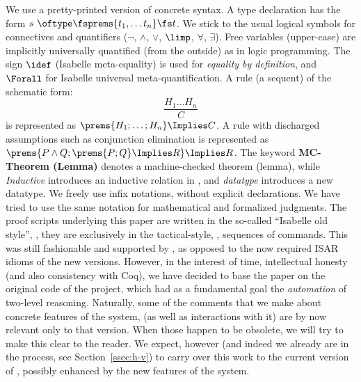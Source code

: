 \documentclass[final]{svjour3}
\begin{document}
 \begin{notation}[\HOL]  
   We use a pretty-printed version of \HOL concrete syntax. A type
   declaration has the form \mbox{$s\ \oftype \fsprems{t_1,\dots t_n}
     \fs t$}.  We stick to the usual logical symbols for \HOL
   connectives and quantifiers ($\neg$, $\land$, $\lor$, $\limp$,
   $\forall$, $\exists$).  Free variables (upper-case) are implicitly
   universally quantified (from the outside) as in logic programming.
   The sign $\idef$ (Isabelle meta-equality) is used for
   \emph{equality by definition}, and $\Forall$ for Isabelle universal
   meta-quantification.  A rule (a sequent) of the schematic form: $$
   \frac {H_1\dots H_n}{C}$$ is represented as $\prems{H_1;\dots; H_n}
   \Implies C$. A rule with discharged assumptions such as conjunction
   elimination is represented as $\prems{ P \land Q ; \prems{P;Q}
     \Implies R} \Implies R$.  The keyword \textbf{MC-Theorem (Lemma)}
   denotes a machine-checked theorem (lemma), while \emph{Inductive}
   introduces an inductive relation in \HOL, and
   \emph{datatype} introduces a new datatype.
   We freely use infix notations, without explicit declarations.  We
   have tried to use the same notation for mathematical and formalized
   judgments. The proof scripts underlying this paper are written in
   the so-called ``Isabelle old style'', \ie, they are exclusively in
   the tactical-style, \eg, sequences of
   commands. This was still fashionable and supported by , as
   opposed to the now required ISAR \cite{ISAR} idioms of the new \HOL
   versions.  However, in the interest of time, intellectual honesty
   (and also consistency with Coq), we have decided to base the paper
   on the original code of the project, which had as a fundamental
   goal the \emph{automation} of two-level reasoning.  Naturally, some
   of the comments that we make about concrete features of the system,
   (as well as interactions with it) are by now relevant only to that
   version. When those happen to be obsolete, we will try to make this
   clear to the reader. We expect, however (and indeed we already are
   in the process, see Section~\ref{ssec:h-v}) to carry over this work
   to the current version of \HOL, possibly enhanced by the new
   features of the system.
 \end{notation}
\end{document}

